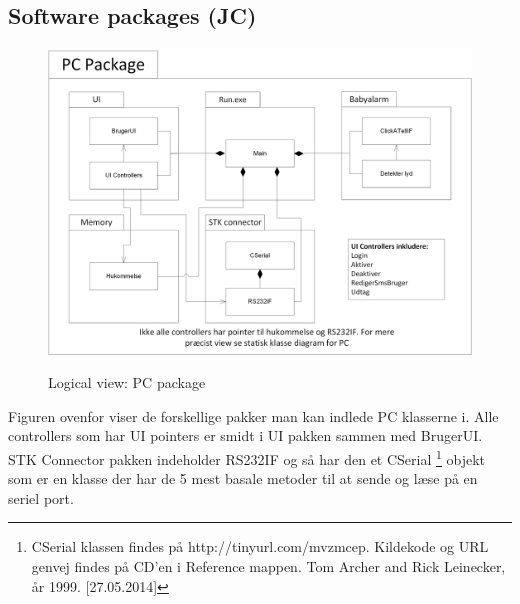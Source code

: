 \clearpage

\subsection{Software packages (JC)}

\begin{figure}[!htb]
     {\includegraphics[width=\textwidth]{billeder/uml/logical_view_pc}}
     \caption{Logical view: PC package}
     \label{fig:PC_package}
\end{figure}

Figuren ovenfor viser de forskellige pakker man kan indlede PC klasserne i. Alle controllers som har UI pointers er smidt i UI pakken sammen med BrugerUI. STK Connector pakken indeholder RS232IF og så har den et CSerial \footnote{CSerial klassen findes på http://tinyurl.com/mvzmcep. Kildekode og URL genvej findes på CD'en i Reference mappen. Tom Archer and Rick Leinecker, år 1999. [27.05.2014] } objekt som er en klasse der har de 5 mest basale metoder til at sende og læse på en seriel port.


\clearpage

